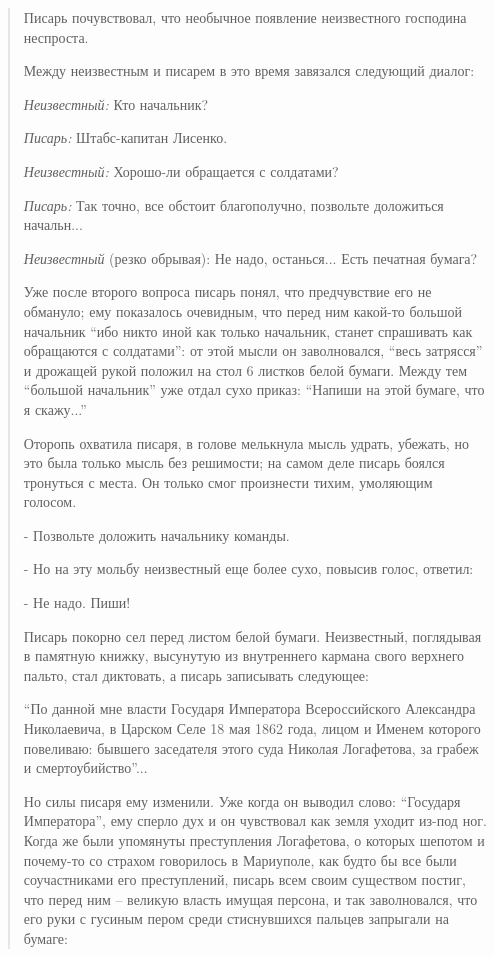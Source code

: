 \begin{quote}
Писарь почувствовал, что необычное появление неизвестного господина неспроста.

Между неизвестным и писарем в это время завязался следующий диалог:

\emph{Неизвестный:} Кто начальник?

\emph{Писарь:} Штабс-капитан Лисенко.

\emph{Неизвестный:} Хорошо-ли обращается с солдатами?

\emph{Писарь:} Так точно, все обстоит благополучно, позвольте доложиться начальн...

\emph{Неизвестный} (резко обрывая): Не надо, останься... Есть печатная бумага? 

Уже после второго вопроса писарь понял, что предчувствие его не обмануло; ему
показалось очевидным, что перед ним какой-то большой начальник \enquote{ибо никто иной
как только начальник, станет спрашивать как обращаются с солдатами}: от этой
мысли он заволновался, \enquote{весь затрясся} и дрожащей рукой положил на стол 6
листков белой бумаги. Между тем \enquote{большой начальник} уже отдал сухо приказ:
\enquote{Напиши на этой бумаге, что я скажу...}

Оторопь охватила писаря, в голове мелькнула мысль удрать, убежать, но это была
только мысль без решимости; на самом деле писарь боялся тронуться с места. Он
только смог произнести тихим, умоляющим голосом.

- Позвольте доложить начальнику команды.

- Но на эту мольбу неизвестный еще более сухо, повысив голос, ответил:

- Не надо. Пиши!

Писарь покорно сел перед листом белой бумаги. Неизвестный, поглядывая в
памятную книжку, высунутую из внутреннего кармана свого верхнего пальто, стал
диктовать, а писарь записывать следующее:

\enquote{По данной мне власти Государя Императора Всероссийского Александра
Николаевича, в Царском Селе 18 мая 1862 года, лицом и Именем которого
повеливаю: бывшего заседателя этого суда Николая Логафетова, за грабеж и
смертоубийство}...

Но силы писаря ему изменили. Уже когда он выводил слово: \enquote{Государя Императора},
ему сперло дух и он чувствовал как земля уходит из-под ног. Когда же были
упомянуты преступления Логафетова, о которых шепотом и почему-то со страхом
говорилось в Мариуполе, как будто бы все были соучастниками его преступлений,
писарь всем своим существом постиг, что перед ним – великую власть имущая
персона, и так заволновался, что его руки с гусиным пером среди стиснувшихся
пальцев запрыгали на бумаге:


\end{quote}
